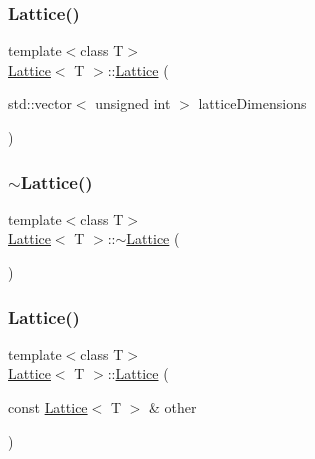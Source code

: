 \mbox{\label{class_lattice_a0c212e4f17842acee8697ce79eef3dff}} 
\subsubsection{\texorpdfstring{Lattice()}{Lattice()}\hspace{0.1cm}{\footnotesize\ttfamily [2/4]}}
{\footnotesize\ttfamily template$<$class T$>$ \\
\mbox{\hyperlink{class_lattice}{Lattice}}$<$ T $>$\+::\mbox{\hyperlink{class_lattice}{Lattice}} (\begin{DoxyParamCaption}\item[{std\+::vector$<$ unsigned int $>$}]{lattice\+Dimensions }\end{DoxyParamCaption})\hspace{0.3cm}{\ttfamily [inline]}}

\mbox{\label{class_lattice_a006bd75dd4c599fe17f8ca7e96413487}} 
\subsubsection{\texorpdfstring{$\sim$Lattice()}{~Lattice()}}
{\footnotesize\ttfamily template$<$class T$>$ \\
\mbox{\hyperlink{class_lattice}{Lattice}}$<$ T $>$\+::$\sim$\mbox{\hyperlink{class_lattice}{Lattice}} (\begin{DoxyParamCaption}{ }\end{DoxyParamCaption})\hspace{0.3cm}{\ttfamily [inline]}}

\mbox{\label{class_lattice_a74cc98beb36f76dcfa27535e43528d57}} 
\subsubsection{\texorpdfstring{Lattice()}{Lattice()}\hspace{0.1cm}{\footnotesize\ttfamily [3/4]}}
{\footnotesize\ttfamily template$<$class T$>$ \\
\mbox{\hyperlink{class_lattice}{Lattice}}$<$ T $>$\+::\mbox{\hyperlink{class_lattice}{Lattice}} (\begin{DoxyParamCaption}\item[{const \mbox{\hyperlink{class_lattice}{Lattice}}$<$ T $>$ \&}]{other }\end{DoxyParamCaption})\hspace{0.3cm}{\ttfamily [inline]}}



